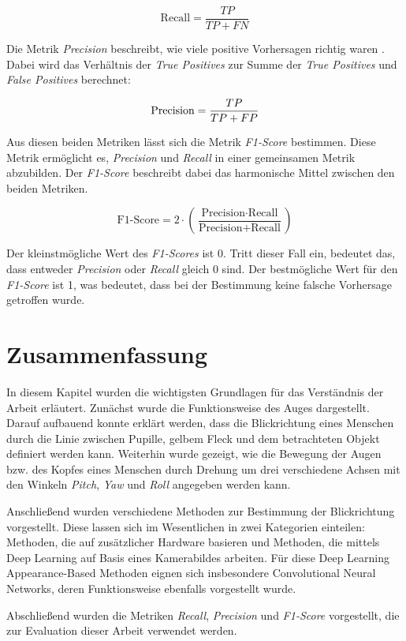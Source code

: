 \[
\text{Recall} = \frac{TP}{TP + FN}
\]

Die Metrik \textit{Precision} beschreibt, wie viele positive Vorhersagen richtig waren \cite{diplom:matthes}. Dabei wird das Verhältnis der \textit{True Positives} zur Summe der \textit{True Positives} und \textit{False Positives} berechnet:

\[
\text{Precision} = \frac{TP}{TP + FP} \\
\]

Aus diesen beiden Metriken lässt sich die Metrik \textit{F1-Score} bestimmen. Diese Metrik ermöglicht es, \textit{Precision} und \textit{Recall} in einer gemeinsamen Metrik \cite{diplom:matthes} abzubilden. Der \textit{F1-Score} beschreibt dabei das harmonische Mittel zwischen den beiden Metriken.

\[
\text{F1-Score} = 2 \cdot \left( \frac{\text{Precision} \cdot \text{Recall}}{\text{Precision} + \text{Recall}} \right)
\]

Der kleinstmögliche Wert des \textit{F1-Scores} ist 0. Tritt dieser Fall ein, bedeutet das, dass entweder \textit{Precision} oder \textit{Recall} gleich 0 sind. Der bestmögliche Wert für den \textit{F1-Score} ist 1, was bedeutet, dass bei der Bestimmung keine falsche Vorhersage getroffen wurde.

\section{Zusammenfassung}

In diesem Kapitel wurden die wichtigsten Grundlagen für das Verständnis der Arbeit erläutert. Zunächst wurde die Funktionsweise des Auges dargestellt. Darauf aufbauend konnte erklärt werden, dass die Blickrichtung eines Menschen durch die Linie zwischen Pupille, gelbem Fleck und dem betrachteten Objekt definiert werden kann. Weiterhin wurde gezeigt, wie die Bewegung der Augen bzw. des Kopfes eines Menschen durch Drehung um drei verschiedene Achsen mit den Winkeln \textit{Pitch}, \textit{Yaw} und \textit{Roll} angegeben werden kann.  

Anschließend wurden verschiedene Methoden zur Bestimmung der Blickrichtung vorgestellt.  Diese lassen sich im Wesentlichen in zwei Kategorien einteilen: Methoden, die auf zusätzlicher Hardware basieren und Methoden, die mittels Deep Learning auf Basis eines Kamerabildes arbeiten. Für diese Deep Learning Appearance-Based Methoden eignen sich insbesondere Convolutional Neural Networks, deren Funktionsweise ebenfalls vorgestellt wurde. 

Abschließend wurden die Metriken \textit{Recall}, \textit{Precision} und \textit{F1-Score} vorgestellt, die zur Evaluation dieser Arbeit verwendet werden. 



